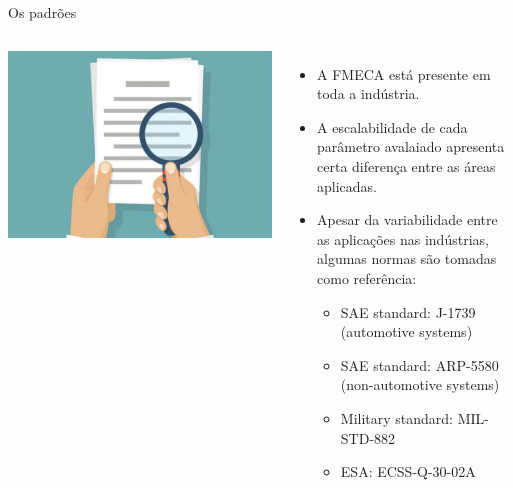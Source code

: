 \documentclass[aspectratio=169]{beamer}
\begin{document}
\begin{frame}[c]{Os padrões}
    \begin{columns}
            \includegraphics[width=1\textwidth, trim={5cm 0 5cm 0},clip]{normas}
            \begin{itemize}
                \item A FMECA está presente em toda a indústria.
                \item A escalabilidade de cada parâmetro avalaiado apresenta certa diferença entre as áreas aplicadas.
                \item Apesar da variabilidade entre as aplicações nas indústrias, algumas normas são tomadas como referência:
                \begin{itemize}
                    \item SAE standard: J-1739 (automotive systems)
                    \item SAE standard: ARP-5580 (non-automotive systems)
                    \item Military standard: MIL-STD-882
                    \item ESA: ECSS-Q-30-02A
                \end{itemize}
            \end{itemize}
    \end{columns}
\end{frame}
\end{document}
